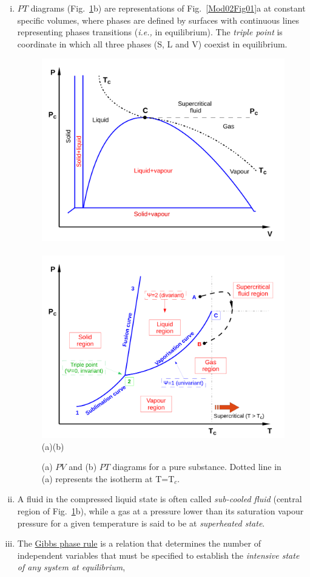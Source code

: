 \documentclass[12pts,a4paper,amsmath,amssymb,floatfix]{article}%
\newcommand{\ie}{{\it i.e., }}
\begin{document}
\begin{enumerate}[i)]
%
       \item $PT$ diagrams (Fig.~\ref{Mod02Fig02}b) are representations of Fig.~\ref{Mod02Fig01}a at constant specific volumes, where phases are defined by surfaces with continuous lines representing phases transitions (\ie in equilibrium). The {\it triple point} is coordinate in which all three phases (S, L and V) coexist in equilibrium.
%
           \begin{figure}[h]\label{Mod02Fig02}
              \vbox{
                    \hbox{\includegraphics[width=.5\columnwidth,clip]{./../Pics/PV_Diagram1}
                          \includegraphics[width=.5\columnwidth,clip]{./../Pics/PT_Diagram}}
                    \vspace{-.1cm}
                    \hbox{\hspace{4cm}(a)\hspace{8cm}(b)}}
              \caption{ (a) $PV$ and (b) $PT$ diagrams for a pure substance. Dotted line in (a) represents the isotherm at T=T$_{c}$.}\label{Mod02Fig02}
           \end{figure}
%
        \item A fluid in the compressed liquid state is often called {\it sub-cooled fluid} (central region of Fig.~\ref{Mod02Fig02}b), while a gas at a pressure lower than its saturation vapour pressure for a given temperature is said to be at {\it superheated state}.
%
        \item The \underline{Gibbs phase rule} is a relation that determines the number of independent variables that must be specified to establish the {\it intensive state of any system at equilibrium},

\end{enumerate}
\end{document}
